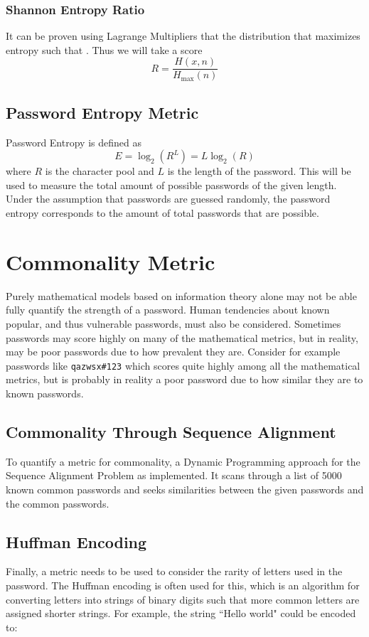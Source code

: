 \documentclass{article}
\begin{document}
\subsubsection{Shannon Entropy Ratio}
It can be proven using Lagrange Multipliers that the distribution that maximizes entropy such that .
Thus we will take a score 
\[
R = \frac{H(x, n)}{H_{\text{max}}(n)}
\]

\subsection{Password Entropy Metric}
Password Entropy is defined as 
\[
E=\log_2(R^L) = L\log_2(R)
\]
where $R$ is the character pool and $L$ is the length of the password.
This will be used to measure the total amount of possible passwords of the given length. Under the assumption that passwords are guessed randomly, the password entropy corresponds to the amount of total passwords that are possible.  

\section{Commonality Metric}
Purely mathematical models based on information theory alone may not be able fully quantify the strength of a password. Human tendencies about known popular, and thus vulnerable passwords, must also be considered. Sometimes passwords may score highly on many of the mathematical metrics, but in reality, may be poor passwords due to how prevalent they are. Consider for example passwords like 
\verb!qazwsx#123!
which scores quite highly among all the mathematical metrics, but is probably in reality a poor password due to how similar they are to known passwords.
\subsection{Commonality Through Sequence Alignment}
To quantify a metric for commonality, a Dynamic Programming approach for the Sequence Alignment Problem as implemented. It scans through a list of 5000 known common passwords and seeks similarities between the given passwords and the common passwords.

\subsection{Huffman Encoding}

Finally, a metric needs to be used to consider the rarity of letters used in the password. The Huffman encoding is often used for this, which is an algorithm for converting letters into strings of binary digits such that more common letters are assigned shorter strings. For example, the string ``Hello world" could be encoded to:
\end{document}
